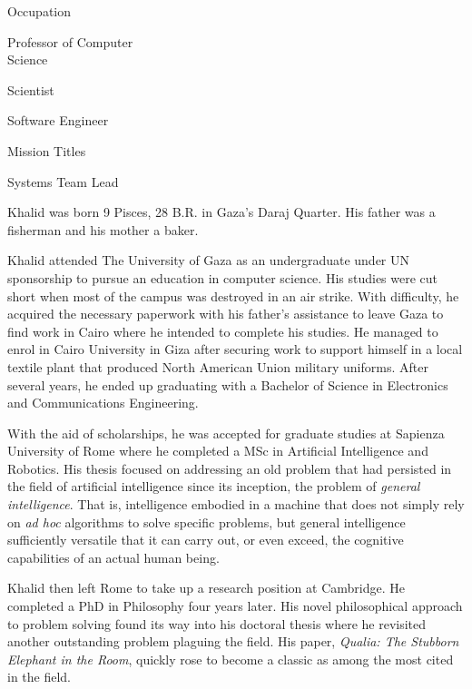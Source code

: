 {        \bTR
            \bTC Occupation \eTC
            \bTC 
                \startitemize[4]
                \startpacked
                \item Professor of Computer\\Science
                \item Scientist
                \item Software Engineer
                \stoppacked
                \stopitemize
            \eTC
        \eTR
        
        \bTR
            \bTC Mission Titles \eTC
            \bTC 
                \startitemize[4]
                \startpacked
                \item Systems Team Lead
                \stoppacked
                \stopitemize
            \eTC
        \eTR
    \eTABLEbody

\eTABLE
}

Khalid was born 9 Pisces, 28 B.R. in Gaza's Daraj Quarter. His father was a fisherman and his mother a baker.

Khalid attended The University of Gaza as an undergraduate under UN sponsorship to pursue an education in computer science. His studies were cut short when most of the campus was destroyed in an air strike. With difficulty, he acquired the necessary paperwork with his father's assistance to leave Gaza to find work in Cairo where he intended to complete his studies. He managed to enrol in Cairo University in Giza after securing work to support himself in a local textile plant that produced North American Union military uniforms. After several years, he ended up graduating with a Bachelor of Science in Electronics and Communications Engineering. 

With the aid of scholarships, he was accepted for graduate studies at Sapienza University of Rome where he completed a MSc in Artificial Intelligence and Robotics. His thesis focused on addressing an old problem that had persisted in the field of artificial intelligence since its inception, the problem of {\it general intelligence}. That is, intelligence embodied in a machine that does not simply rely on {\it ad hoc} algorithms to solve specific problems, but general intelligence sufficiently versatile that it can carry out, or even exceed, the cognitive capabilities of an actual human being.

Khalid then left Rome to take up a research position at Cambridge. He completed a PhD in Philosophy four years later. His novel philosophical approach to problem solving found its way into his doctoral thesis where he revisited another outstanding problem plaguing the field. His paper, {\it Qualia: The Stubborn Elephant in the Room}, quickly rose to become a classic as among the most cited in the field.

